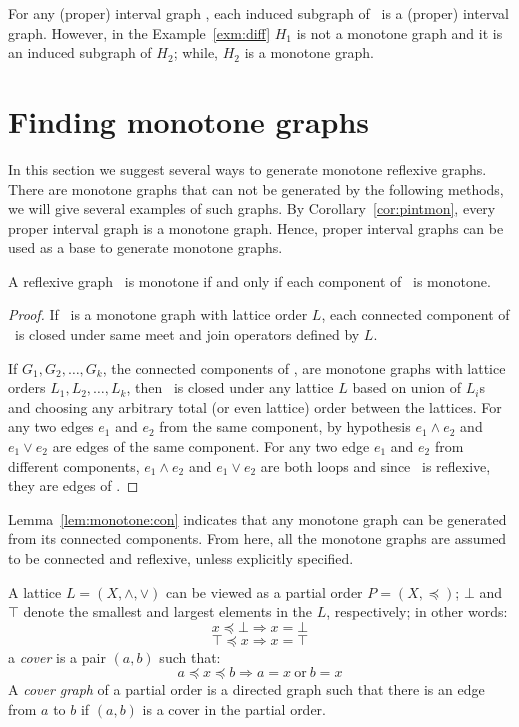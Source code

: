For any (proper) interval graph \mH, each induced subgraph of \mH\ is a 
(proper) interval graph. However, in the Example~\ref{exm:diff} \(H_1\)
is not a monotone graph and it is an induced 
subgraph of \(H_2\); while, \(H_2\) is a monotone graph.

\section{Finding monotone graphs}
In this section we suggest several ways to generate monotone reflexive graphs.
There are monotone graphs that can not be generated by the following methods,
we will give several examples of such graphs.
By Corollary~\ref{cor:pintmon}, every proper interval graph is a monotone graph.
Hence, proper interval graphs can be used as a base to generate monotone graphs.

\begin{lemma} \label{lem:monotone:con}
A reflexive graph \mG\ is monotone if and only if each component of \mG\ is monotone.
\end{lemma}

\begin{proof}
If \mG\ is a monotone graph with lattice order \(L\), each connected component of \mG\ is
closed under same meet and join operators defined by \(L\)\@. 

If \(G_1,G_2,\dotsc,G_k\), the connected components of \mG, are
monotone graphs with lattice orders \(L_1,L_2,\dotsc,L_k\),
then \mG\ is closed under any lattice \(L\) based on union of \(L_i\)s
and choosing any arbitrary total (or even lattice) order between the
lattices. For any two edges \(e_1\) and \(e_2\) from the same component,
by hypothesis \(e_1\wedge e_2\) and \(e_1\vee e_2\) are
edges of the same component.
For any two edge \(e_1\) and \(e_2\) from different components,
\(e_1\wedge e_2\) and \(e_1\vee e_2\) are both loops and since \mG\ is reflexive,
they are edges of \mG\@.
\end{proof}

Lemma~\ref{lem:monotone:con} indicates that any monotone graph can be generated
from its connected components. From here, all the monotone graphs are
assumed to be connected and reflexive, unless explicitly specified.

A lattice \(L=(X,\wedge,\vee)\) can be viewed as a partial order \(P=(X,\preceq)\);
\(\bot\) and \(\top\) denote the smallest and largest elements in the \(L\), 
respectively; in other words:
\[x \preceq \bot \Rightarrow x = \bot \]
\[\top \preceq x \Rightarrow x = \top \]
a \emph{cover} is a pair \((a,b)\) such that:
\[a \preceq x \preceq b \Rightarrow a = x\ \mathrm{or}\ b = x\]
A \emph{cover graph} of a partial order is a directed graph such that there is
an edge from \(a\) to \(b\) if \((a,b)\) is a cover in the partial order.

